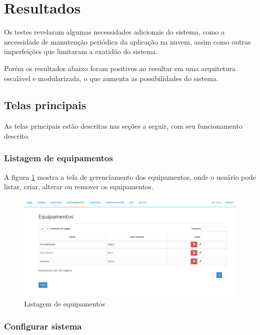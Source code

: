 \section{Resultados}
\label{Sec:6-resultados}

Os testes revelaram algumas necessidades adicionais do sistema, como a necessidade de manutenção periódica da aplicação na nuvem, assim como outras imperfeições que limitaram a exatidão do sistema. 

Porém os resultados abaixo foram positivos ao resultar em uma arquitetura escalável e modularizada, o que aumenta as possibilidades do sistema.

\subsection{Telas principais}

As telas principais estão descritas nas seções a seguir, com seu funcionamento descrito.

\subsubsection{Listagem de equipamentos}

A figura \ref{fig:telas-equipamentos-list} mostra a tela de gerenciamento dos equipamentos, onde o usuário pode listar, criar, alterar ou remover os equipamentos.

\begin{figure}[H]
\centering
\includegraphics[width=1\textwidth]{figuras/equipamentos_list.jpg}
\caption{\label{fig:telas-equipamentos-list} Listagem de equipamentos}
\end{figure}

\subsubsection{Configurar sistema}

